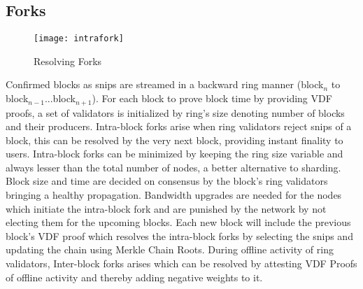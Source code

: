 \documentclass[../Bitcoin Blink.tex]{subfiles}
\begin{document}
\subsection{Forks}
\begin{figure}[H]
\begin{center}
\texttt{[image: intrafork]}
\caption{Resolving Forks}
\end{center}
\end{figure}
Confirmed blocks as snips are streamed in a backward ring manner (block$_n$ to block$_{n-1}$...block$_{n+1}$). For each block to prove block time by providing VDF proofs, a set of validators is initialized by ring's size denoting number of blocks and their producers. Intra-block forks arise when ring validators reject snips of a block, this can be resolved by the very next block, providing instant finality to users. Intra-block forks can be minimized by keeping the ring size variable and always lesser than the total number of nodes, a better alternative to sharding. Block size and time are decided on consensus by the block's ring validators bringing a healthy propagation. Bandwidth upgrades are needed for the nodes which initiate the intra-block fork and are punished by the network by not electing them for the upcoming blocks. Each new block will include the previous block's VDF proof which resolves the intra-block forks by selecting the snips and updating the chain using Merkle Chain Roots. During offline activity of ring validators, Inter-block forks arises which can be resolved by attesting VDF Proofs of offline activity and thereby adding negative weights to it.
\end{document}
